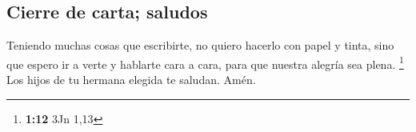 \hypertarget{cierre-de-carta-saludos}{%
\subsection{Cierre de carta; saludos}\label{cierre-de-carta-saludos}}

 Teniendo muchas cosas que escribirte, no quiero hacerlo
con papel y tinta, sino que espero ir a verte y hablarte cara a cara,
para que nuestra alegría sea plena. \footnote{\textbf{1:12} 3Jn 1,13}
 Los hijos de tu hermana elegida te saludan. Amén.
